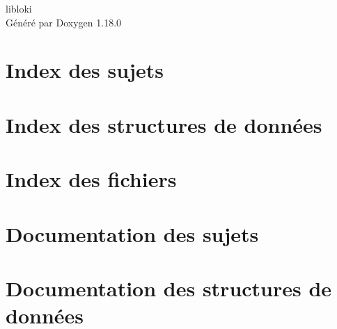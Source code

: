 \documentclass[twoside]{book}
\newcommand{\+}{\discretionary{\mbox{\scriptsize$\hookleftarrow$}}{}{}}
\newcommand{\clearemptydoublepage}{%
    \newpage{\pagestyle{empty}\cleardoublepage}%
  }
\begin{document}
  \raggedbottom
    \hypersetup{pageanchor=false,
                bookmarksnumbered=true,
                pdfencoding=unicode
               }
  \begin{titlepage}
  \vspace*{7cm}
  \begin{center}%
  {\Large libloki}\\
  \vspace*{1cm}
  {\large Généré par Doxygen 1.18.0}\\
  \end{center}
  \end{titlepage}
  \clearemptydoublepage
  \tableofcontents
  \clearemptydoublepage
  \hypersetup{pageanchor=true}
\chapter{Index des sujets}

\chapter{Index des structures de données}

\chapter{Index des fichiers}

\chapter{Documentation des sujets}





\chapter{Documentation des structures de données}



































\end{document}

